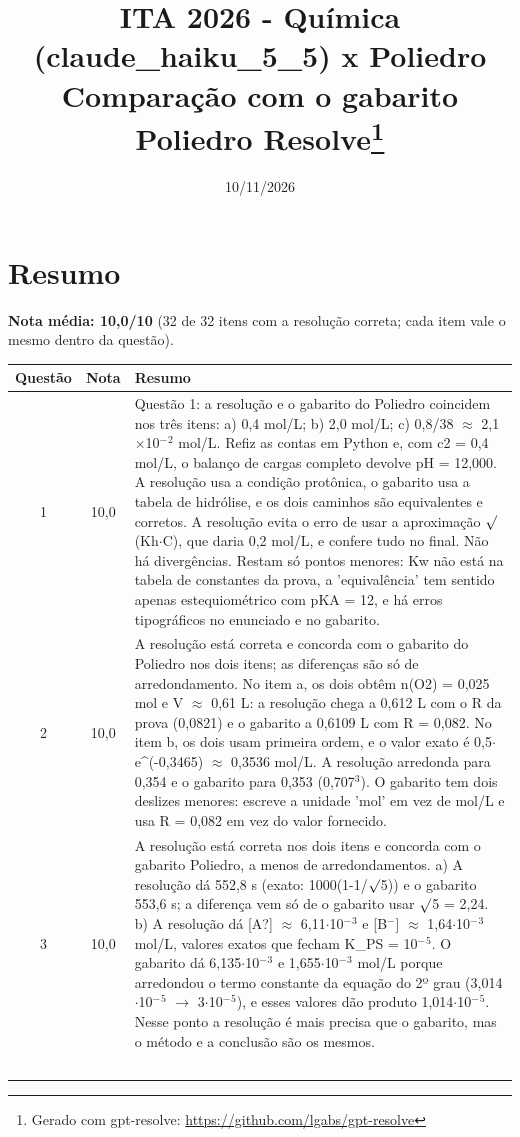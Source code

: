 \documentclass{article}%
\title{ITA 2026 {-} Química (claude\_haiku\_5\_5) x Poliedro\\[4pt]\large Comparação com o gabarito Poliedro Resolve\thanks{Gerado com gpt-resolve: \url{https://github.com/lgabs/gpt-resolve}}}%
\date{10/11/2026}%
\begin{document}
%
\normalsize%
\maketitle%
\section*{Resumo}\textbf{Nota média: 10,0/10} (32 de 32 itens com a resolução correta; cada item vale o mesmo dentro da questão).\par\medskip%
\begin{longtable}{@{}c c p{}@{}}\toprule Questão & Nota & Resumo \\ \midrule
1 & 10,0 & Questão 1: a resolução e o gabarito do Poliedro coincidem nos três itens: a) 0,4 mol/L; b) 2,0 mol/L; c) 0,8/38 $\approx$ 2,1$\times$10$^{-}$$^2$ mol/L. Refiz as contas em Python e, com c2 = 0,4 mol/L, o balanço de cargas completo devolve pH = 12,000. A resolução usa a condição protônica, o gabarito usa a tabela de hidrólise, e os dois caminhos são equivalentes e corretos. A resolução evita o erro de usar a aproximação $\surd$(Kh$\cdot$C), que daria 0,2 mol/L, e confere tudo no final. Não há divergências. Restam só pontos menores: Kw não está na tabela de constantes da prova, a 'equivalência' tem sentido apenas estequiométrico com pKA = 12, e há erros tipográficos no enunciado e no gabarito. \\
2 & 10,0 & A resolução está correta e concorda com o gabarito do Poliedro nos dois itens; as diferenças são só de arredondamento. No item a, os dois obtêm n(O2) = 0,025 mol e V $\approx$ 0,61 L: a resolução chega a 0,612 L com o R da prova (0,0821) e o gabarito a 0,6109 L com R = 0,082. No item b, os dois usam primeira ordem, e o valor exato é 0,5$\cdot$e\^{}(-0,3465) $\approx$ 0,3536 mol/L. A resolução arredonda para 0,354 e o gabarito para 0,353 (0,707$^3$). O gabarito tem dois deslizes menores: escreve a unidade 'mol' em vez de mol/L e usa R = 0,082 em vez do valor fornecido. \\
3 & 10,0 & A resolução está correta nos dois itens e concorda com o gabarito Poliedro, a menos de arredondamentos. a) A resolução dá 552,8 s (exato: 1000(1-1/$\surd$5)) e o gabarito 553,6 s; a diferença vem só de o gabarito usar $\surd$5 = 2,24. b) A resolução dá {[}A?{]} $\approx$ 6,11$\cdot$10$^{-}$$^3$ e {[}B$^{-}${]} $\approx$ 1,64$\cdot$10$^{-}$$^3$ mol/L, valores exatos que fecham K\_PS = 10$^{-}$$^{5}$. O gabarito dá 6,135$\cdot$10$^{-}$$^3$ e 1,655$\cdot$10$^{-}$$^3$ mol/L porque arredondou o termo constante da equação do 2º grau (3,014$\cdot$10$^{-}$$^{5}$ $\to$ 3$\cdot$10$^{-}$$^{5}$), e esses valores dão produto 1,014$\cdot$10$^{-}$$^{5}$. Nesse ponto a resolução é mais precisa que o gabarito, mas o método e a conclusão são os mesmos. \\
$$
\end{longtable}
\end{document}
